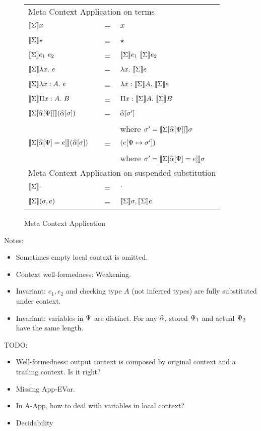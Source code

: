 \begin{figure}[t]
    \begin{tabular}{lll}
      \multicolumn{3}{l}{Meta Context Application on terms}\\
        $\llbracket{\Sigma}\rrbracket x $ & = & $x$ \\
        $\llbracket{\Sigma}\rrbracket \star $ & = & $\star$ \\
        $\llbracket{\Sigma}\rrbracket e_1 ~ e_2 $ & = & ${\llbracket{\Sigma}\rrbracket e_1} ~ {\llbracket{\Sigma}\rrbracket e_2}$ \\
        $\llbracket{\Sigma}\rrbracket \lambda {x}.~ e $ & = & $\lambda {x}.~ {\llbracket{\Sigma}\rrbracket e}$ \\
        $\llbracket{\Sigma}\rrbracket \lambda x:A.~ e $ & = & $\lambda x:\llbracket{\Sigma}\rrbracket A.~ {\llbracket{\Sigma}\rrbracket e}$ \\
        $\llbracket{\Sigma}\rrbracket \Pi x:A.~ B $ & = & $\Pi x:\llbracket{\Sigma}\rrbracket A.~ {\llbracket{\Sigma}\rrbracket B}$ \\
        $\llbracket{\Sigma[\widehat{\alpha}[\Psi]]}\rrbracket (\widehat{\alpha}[\sigma]) $ & = & $\widehat{\alpha}[\sigma'] $ \\
           & & where $\sigma' = \llbracket{\Sigma[\widehat{\alpha}[\Psi]]}\rrbracket \sigma$\\
        $\llbracket{\Sigma[\widehat{\alpha}[\Psi] = e]}\rrbracket (\widehat{\alpha}[\sigma]) $ & = & ${(e [\Psi \mapsto \sigma'])} $ \\
           & & where $\sigma' = \llbracket{\Sigma[\widehat{\alpha}[\Psi] = e]}\rrbracket \sigma$\\
      \multicolumn{3}{l}{Meta Context Application on suspended substitution}\\
        $\llbracket{\Sigma}\rrbracket \cdot $ & = & $\cdot$ \\
        $\llbracket{\Sigma}\rrbracket (\sigma, e) $ & = & $\llbracket{\Sigma}\rrbracket \sigma, \llbracket{\Sigma}\rrbracket e$ \\
    \end{tabular}
    \caption{Meta Context Application}
    \label{figure:erasure}
\end{figure}


Notes:
\begin{itemize}
  \item Sometimes empty local context is omitted.
  \item Context well-formedness: Weakening.
  \item Invariant: $e_1, e_2$ and checking type $A$ (not inferred types) are
    fully substituted under context.
    \item Invariant: variables in $\Psi$ are distinct. For any $\widehat{\alpha}$, stored
      $\Psi_1$ and actual $\Psi_2$ have the same length.
\end{itemize}

TODO:
\begin{itemize}
  \item Well-formedness: output context is composed by original context and a
    trailing context. Is it right?
  \item Missing App-EVar.
  \item In A-App, how to deal with variables in local context?
  \item Decidability
\end{itemize}

